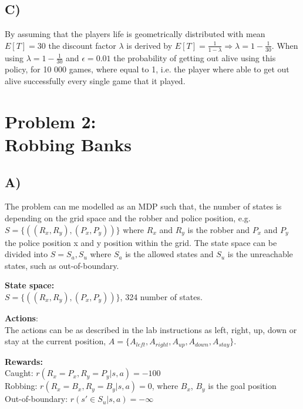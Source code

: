 \documentclass{article}
\begin{document}
\subsection*{C)}
By assuming that the players life is geometrically distributed with mean $E[T] = 30$ the discount factor $\lambda$ is derived by $E[T] =  \frac{1}{1 - \lambda} \Rightarrow \lambda = 1 - \frac{1}{30}$. When using $\lambda = 1 - \frac{1}{30}$ and $\epsilon = 0.01$ the probability of getting out alive using this policy, for 10 000 games, where equal to 1, i.e. the player where able to get out alive successfully every single game that it played.









\section*{Problem 2: \\
        Robbing Banks}
        
        
\subsection*{A)}
The problem can me modelled as an MDP such that, the number of states is depending on the grid space and the robber and police position, e.g. $S = \{((R_x, R_y),(P_x, P_y) )\} $ where $R_x$ and $R_y$ is the robber and $P_x$ and $P_y$ the police position x and y position within the grid. The state space can be divided into $S = {S_a, S_u}$ where $S_a$ is the allowed states and $S_u$ is the unreachable states, such as out-of-boundary.


\textbf{State space:}\\
$S = \{((R_x, R_y),(P_x, P_y) )\} $, 324 number of states. 

\textbf{Actions}: \\
The actions can be as described in the lab instructions as left, right, up, down or stay at the current position, $A = \{ A_{left}, A_{right}, A_{up}, A_{down}, A_{stay} \}$. 

\textbf{Rewards:} \\
Caught: $r(R_x = P_x , R_y = P_y |s,a) = -100 $\\ 
Robbing: $r(R_x = B_x , R_y = B_y |s,a) = 0 $, where $B_x$, $B_y$ is the goal position\\
Out-of-boundary: $r(s'\in S_u |s,a) = -\infty $
\end{document}
